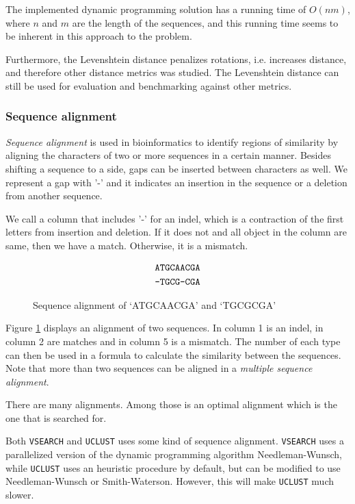 The implemented dynamic programming solution has a running time of $O(nm)$,
where $n$ and $m$ are the length of the sequences, and this running time seems
to be inherent in this approach to the problem.


Furthermore, the Levenshtein distance penalizes rotations, i.e. increases
distance, and therefore other distance metrics was studied. The Levenshtein
distance can still be used for evaluation and benchmarking against other
metrics.


\subsubsection{Sequence alignment}
\emph{Sequence alignment} is used in bioinformatics to identify regions of
similarity by aligning the characters of two or more sequences in a certain
manner. Besides shifting a sequence to a side, gaps can be inserted between
characters as well.  We represent a gap with '-' and it indicates an 
insertion in the sequence or a deletion from another sequence.

We call a column that includes '-' for an indel, which is a contraction of the first letters from insertion and deletion. If it does not and all object in
the column are same, then we have a match. Otherwise, it is a mismatch.

\begin{figure}[H]
  \centering
  \begin{align*}
    \mbox{\texttt{ATGCAACGA}} \\
    \mbox{\texttt{-TGCG-CGA}}
  \end{align*}
  \caption{Sequence alignment of `ATGCAACGA' and `TGCGCGA'}
  \label{fig:seqAlignment}
\end{figure}

Figure \ref{fig:seqAlignment} displays an alignment of two sequences. In column
1 is an indel, in column 2 are matches and in column 5 is a mismatch.  The
number of each type can then be used in a formula to calculate the similarity
between the sequences. Note that more than two sequences can be aligned in a
\emph{multiple sequence alignment}.

There are many alignments. Among those is an optimal alignment which is the one
that is searched for.

Both \texttt{VSEARCH} and \texttt{UCLUST} uses some kind of sequence alignment.
\texttt{VSEARCH} uses a parallelized version of the dynamic programming
algorithm Needleman-Wunsch, while \texttt{UCLUST} uses an heuristic procedure
by default, but can be modified to use Needleman-Wunsch or Smith-Waterson.
However, this will make \texttt{UCLUST} much slower.


